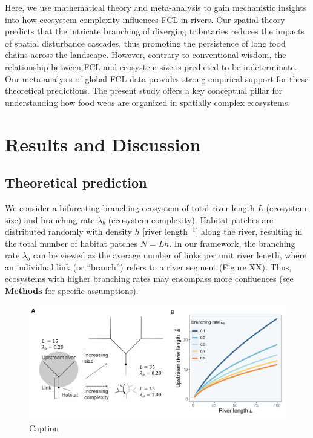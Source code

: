 \documentclass[11pt, class=article, crop=false]{standalone}
\begin{document}
Here, we use mathematical theory and meta-analysis to gain mechanistic insights into how ecosystem complexity influences FCL in rivers.
Our spatial theory predicts that the intricate branching of diverging tributaries reduces the impacts of spatial disturbance cascades, thus promoting the persistence of long food chains across the landscape.
However, contrary to conventional wisdom, the relationship between FCL and ecosystem size is predicted to be indeterminate.
Our meta-analysis of global FCL data provides strong empirical support for these theoretical predictions.
The present study offers a key conceptual pillar for understanding how food webs are organized in spatially complex ecosystems.

\section{Results and Discussion}

\subsection{Theoretical prediction}

We consider a bifurcating branching ecosystem of total river length $L$ (ecosystem size) and branching rate $\lambda_b$ (ecosystem complexity).
Habitat patches are distributed randomly with density $h$ [river length$^{-1}$] along the river, resulting in the total number of habitat patches $N = Lh$.
In our framework, the branching rate $\lambda_b$ can be viewed as the average number of links per unit river length, where an individual link (or ``branch'') refers to a river segment (Figure XX).
Thus, ecosystems with higher branching rates may encompass more confluences (see \textbf{Methods} for specific assumptions).

\begin{figure}
    \centering
    \includegraphics[width=\textwidth]{output/fig_scheme.pdf}
    \caption{Caption}
    \label{fig:enter-label}
\end{figure}
\end{document}
